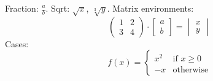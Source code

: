 \documentclass{article}
\begin{document}
Fraction: $\frac{a}{b}$. Sqrt: $\sqrt{x}$, $\sqrt[3]{y}$.
Matrix environments:
\begin{equation}
  \begin{pmatrix} 1 & 2 \\ 3 & 4 \end{pmatrix} \cdot \begin{bmatrix} a \\ b \end{bmatrix} = \begin{vmatrix} x \\ y \end{vmatrix}
\end{equation}
Cases:
\[
  f(x) = \begin{cases} x^2 & \text{if } x \geq 0 \\ -x & \text{otherwise} \end{cases}
\]
\end{document}
